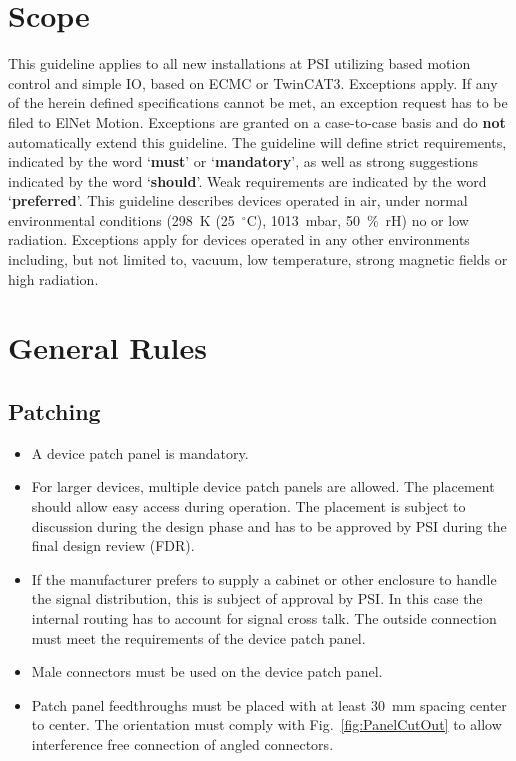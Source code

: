 \section{Scope}
This guideline applies to all new installations at PSI utilizing \EtherCAT{} based motion control and simple IO, based on ECMC or TwinCAT3.
Exceptions apply.
If any of the herein defined specifications cannot be met, an exception request has to be filed to ElNet Motion.
Exceptions are granted on a case-to-case basis and do \textbf{not} automatically extend this guideline.
The guideline will define strict requirements, indicated by the word ‘\textbf{must}’ or ‘\textbf{mandatory}’, as well as strong suggestions indicated by the word ‘\textbf{should}’.
Weak requirements are indicated by the word ‘\textbf{preferred}’.
This guideline describes devices operated in air, under normal environmental conditions (298~K (25~$^\circ$C), 1013~mbar, 50~\%~rH) no or low radiation.
Exceptions apply for devices operated in any other environments including, but not limited to, vacuum, low temperature, strong magnetic fields or high radiation.



\section{General Rules}
\subsection{Patching}
\begin{itemize}
    \item A device patch panel is mandatory.
    \item For larger devices, multiple device patch panels are allowed.
    The placement should allow easy access during operation. 
    The placement is subject to discussion during the design phase and has to be approved by PSI during the final design review (FDR).
    \item If the manufacturer prefers to supply a cabinet or other enclosure to handle the signal distribution, this is subject of approval by PSI.
    In this case the internal routing has to account for signal cross talk.
    The outside connection must meet the requirements of the device patch panel. 
    \item Male connectors must be used on the device patch panel.
    \item Patch panel feedthroughs must be placed with at least 30~mm spacing center to center.
    The orientation must comply with Fig.~\ref{fig:PanelCutOut} to allow interference free connection of angled connectors.
\end{itemize}

